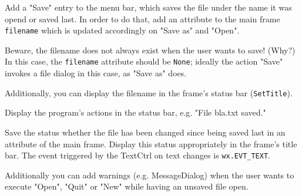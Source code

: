 \begin{aufgabe}
\begin{teilaufgabe}[Save]
Add a "Save" entry to the menu bar, which saves the file under the name it was opend or saved last. In order to do that, add an attribute to the main frame  \lstinline{filename} which is updated accordingly on "Save as" and "Open".

Beware, the filename does not always exist when the user wants to save! (Why?) In this case, the \lstinline{filename} attribute should be \lstinline{None}; ideally the action "Save" invokes a file dialog in this case, as "Save as" does.

Additionally, you can display the filename in the frame's status bar (\lstinline{SetTitle}).
\end{teilaufgabe}

\begin{teilaufgabe}
Display the program's actions in the status bar, e.g. "File bla.txt saved."
\end{teilaufgabe}

\begin{teilaufgabe}
Save the status whether the file has been changed since being saved last in an attribute of the main frame. Display this status appropriately in the frame's title bar. The event triggered by the TextCtrl on text changes is \lstinline{wx.EVT_TEXT}.

Additionally you can add warnings (e.g. MessageDialog) when the user wants to execute "Open", "Quit" or "New" while having an unsaved file open.
\end{teilaufgabe}

\end{aufgabe}

